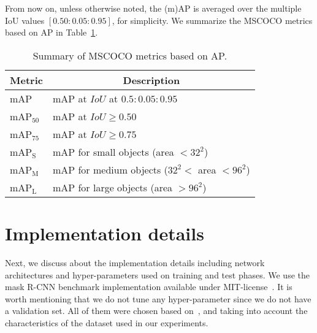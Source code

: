 From now on, unless otherwise noted, the (m)AP is averaged over the multiple IoU values $[0.50: 0.05: 0.95]$, for simplicity.
We summarize the MSCOCO metrics based on AP in Table~\ref{tab:metrics}.
%
\begin{table}[h]
\caption{Summary of MSCOCO metrics based on AP.}
\label{tab:metrics}
\centering
\begin{tabular}{@{}ll@{}}
\toprule
\multicolumn{1}{c}{{\bf Metric}} & \multicolumn{1}{c}{{\bf Description}} \\ \midrule
mAP        & mAP at $IoU$ at $0.5:0.05:0.95$\\
mAP$_{50}$ & mAP at $IoU \geq 0.50$\\
mAP$_{75}$ & mAP at $IoU \geq 0.75$\\
\midrule
mAP$_{\textrm{S}}$           & mAP for small objects (area $ < 32^2$)\\
mAP$_{\textrm{M}}$           & mAP for medium objects ($32^2 <$ area $< 96^2$)\\
mAP$_{\textrm{L}}$           & mAP for large objects (area $ > 96^2$)\\
\bottomrule
\end{tabular}
\end{table}

%
\section{Implementation details}
%
Next, we discuss about the implementation details including network architectures and hyper-parameters used on training and test phases.
We use the mask R-CNN benchmark implementation available under MIT-license~\cite{massa2018mrcnn}.
It is worth mentioning that we do not tune any hyper-parameter since we do not have a validation set.
All of them were chosen based on~\cite{He2017mask}, and taking into account the characteristics of the dataset used in our experiments.

